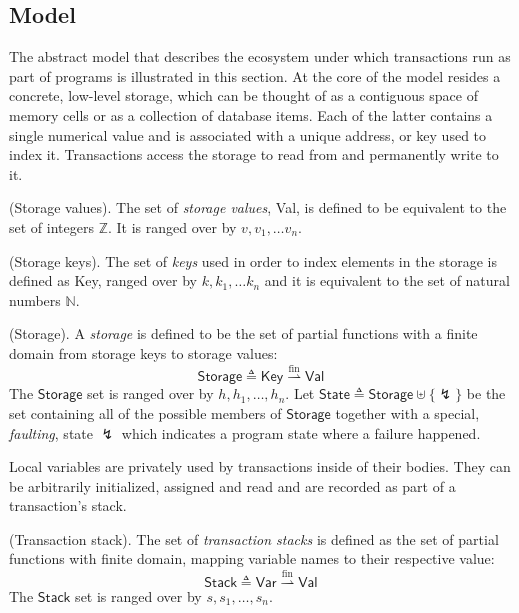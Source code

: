 \subsection{Model}

\label{sec:2plMod}

The abstract model that describes the ecosystem under which transactions run as part of programs is illustrated in this section. At the core of the model resides a concrete, low-level storage, which can be thought of as a contiguous space of memory cells or as a collection of database items. Each of the latter contains a single numerical value and is associated with a unique address, or key used to index it. Transactions access the storage to read from and permanently write to it.

\begin{defn}
	(Storage values).
	The set of \emph{storage values}, \textsf{Val}, is defined to be equivalent to the set of integers $\mathds{Z}$. It is ranged over by $v, v_1, \ldots v_n$.
\end{defn}

\begin{defn}
	(Storage keys).
	The set of \emph{keys} used in order to index elements in the storage is defined as \textsf{Key}, ranged over by $k, k_1, \ldots k_n$ and it is equivalent to the set of natural numbers $\mathds{N}$.
\end{defn}

\begin{defn}
	(Storage).
	A \emph{storage} is defined to be the set of partial functions with a finite domain from storage keys to storage values:
	\[
		\mathsf{Storage} \triangleq \mathsf{Key} \overset{\text{fin}}{\rightharpoonup} \mathsf{Val}
	\]
	The $\mathsf{Storage}$ set is ranged over by $h, h_1, \ldots, h_n$. Let $\mathsf{State} \triangleq \mathsf{Storage} \uplus \{\lightning\}$ be the set containing all of the possible members of $\mathsf{Storage}$ together with a special, \textit{faulting}, state $\lightning$ which indicates a program state where a failure happened.	
\end{defn}

Local variables are privately used by transactions inside of their bodies. They can be arbitrarily initialized, assigned and read and are recorded as part of a transaction's stack.
\begin{defn}
	(Transaction stack).
	The set of \emph{transaction stacks} is defined as the set of partial functions with finite domain, mapping variable names to their respective value:
	\[
		\mathsf{Stack} \triangleq \mathsf{Var} \overset{\text{fin}}{\rightharpoonup} \mathsf{Val}
	\]
	The $\mathsf{Stack}$ set is ranged over by $s, s_1, \ldots, s_n$.
\end{defn}


